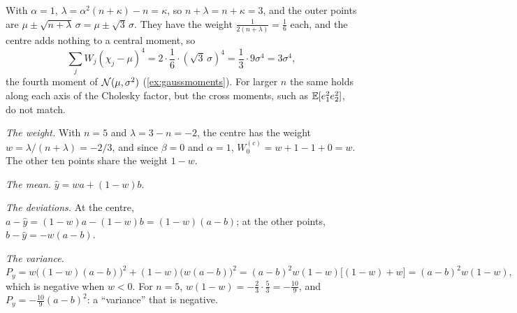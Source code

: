  With $\alpha=1$, $\lambda=\alpha^2(n+\kappa)-n=\kappa$, so
$n+\lambda=n+\kappa=3$, and the outer points are
$\mu\pm\sqrt{n+\lambda}\,\sigma=\mu\pm\sqrt3\,\sigma$. They have the weight
$\frac1{2(n+\lambda)}=\frac16$ each, and the centre adds nothing to a
central moment, so
\[
  \sum_jW_j(\chi_j-\mu)^4=2\cdot\frac16\cdot(\sqrt3\,\sigma)^4
  =\frac13\cdot9\sigma^4=3\sigma^4,
\]
the fourth moment of $\mathcal{N}(\mu,\sigma^2)$ (\cref{ex:gaussmoments}).
For larger $n$ the same holds along each axis of the Cholesky factor, but
the cross moments, such as $\mathbb{E}[e_1^2e_2^2]$, do not match.

 \emph{The weight.} With $n=5$ and $\lambda=3-n=-2$, the
centre has the weight $w=\lambda/(n+\lambda)=-2/3$, and since $\beta=0$
and $\alpha=1$, $W^{(c)}_0=w+1-1+0=w$. The other ten points share the
weight $1-w$.

\emph{The mean.} $\hat y=wa+(1-w)b$.

\emph{The deviations.} At the centre, $a-\hat y=(1-w)a-(1-w)b
=(1-w)(a-b)$; at the other points, $b-\hat y=-w(a-b)$.

\emph{The variance.}
\[
  P_y=w\bigl((1-w)(a-b)\bigr)^2+(1-w)\bigl(w(a-b)\bigr)^2
  =(a-b)^2w(1-w)\bigl[(1-w)+w\bigr]=(a-b)^2w(1-w),
\]
which is negative when $w<0$. For $n=5$, $w(1-w)=-\frac23\cdot\frac53
=-\frac{10}9$, and $P_y=-\frac{10}9(a-b)^2$: a ``variance'' that is
negative.
